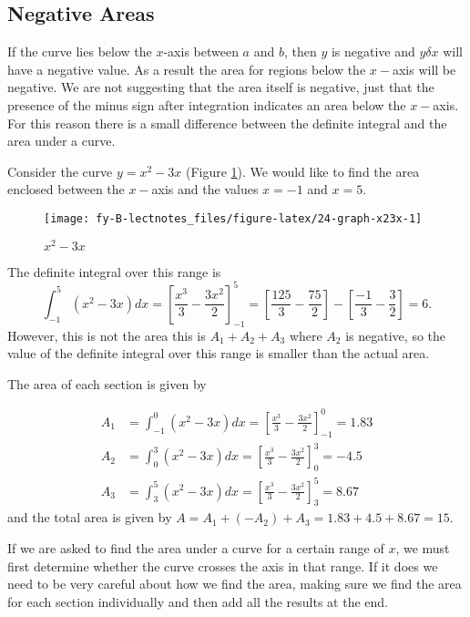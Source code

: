 \documentclass[
  11pt,
  oneside]{book}
\newcommand{\slide}{}
\theoremstyle{definition}
\theoremstyle{definition}
\theoremstyle{definition}
\theoremstyle{definition}
\theoremstyle{remark}
\begin{document}
\slide

\subsection{Negative Areas}\label{negative-areas}

If the curve lies below the \(x\)-axis between \(a\) and \(b\), then \(y\) is negative and \(y\delta x\) will have a negative value. As a result the area for regions below the \(x-\)axis will be negative. We are not suggesting that the area itself is negative, just that the presence of the minus sign after integration indicates an area below the \(x-\)axis. For this reason there is a small difference between the definite integral and the area under a curve.

Consider the curve \(y = x^2 - 3x\) (Figure \ref{fig:24-graph-x23x}). We would like to find the area enclosed between the \(x-\)axis and the values \(x = -1\) and \(x = 5\).

\begin{figure}

{\centering \texttt{[image: fy-B-lectnotes\_files/figure-latex/24-graph-x23x-1]} 

}

\caption{$x^2-3x$}\label{fig:24-graph-x23x}
\end{figure}

The definite integral over this range is
\[
\int_{-1}^5(x^2-3x)dx = \left[\frac{x^3}3-\frac{3x^2}2\right]_{-1}^5 = \left[\frac{125}3-\frac{75}2\right]-\left[\frac{-1}3-\frac{3}2\right]=6.
\]
However, this is not the area this is \(A_1 + A_2 + A_3\) where \(A_2\) is negative, so the value of the definite integral over this range is smaller than the actual area.

The area of each section is given by

\begin{align*}
A_1&=\int_{-1}^0(x^2-3x)dx = \left[\frac{x^3}3-\frac{3x^2}2\right]_{-1}^0 = 1.83\\
A_2&=\int_{0}^3(x^2-3x)dx = \left[\frac{x^3}3-\frac{3x^2}2\right]_{0}^3 = -4.5\\
A_3&=\int_{3}^5(x^2-3x)dx = \left[\frac{x^3}3-\frac{3x^2}2\right]_{3}^5 = 8.67
\end{align*}
and the total area is given by \(A = A_1 + (-A_2) + A_3 = 1.83 + 4.5 + 8.67 = 15\).

If we are asked to find the area under a curve for a certain range of \(x\), we must first determine whether the curve crosses the axis in that range. If it does we need to be very careful about how we find the area, making sure we find the area for each section individually and then add all the results at the end.
\end{document}
